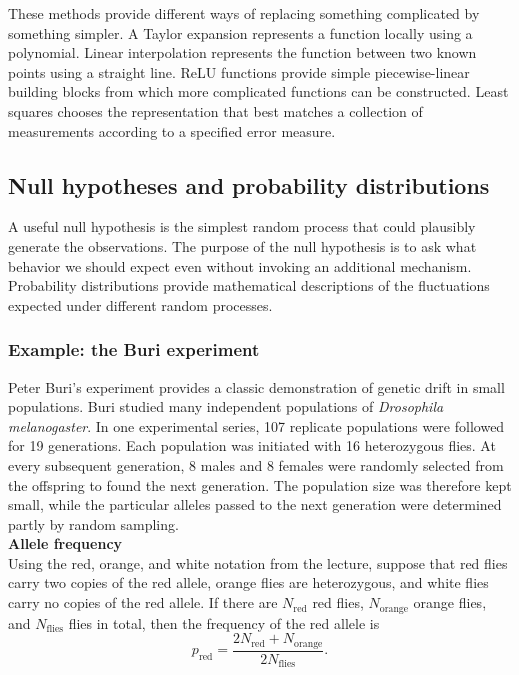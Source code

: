 \bigskip

These methods provide different ways of replacing something complicated by something simpler.
A Taylor expansion represents a function locally using a polynomial.
Linear interpolation represents the function between two known points using a straight line.
ReLU functions provide simple piecewise-linear building blocks from which more complicated functions can be constructed.
Least squares chooses the representation that best matches a collection of measurements according to a specified error measure.


\subsection{Null hypotheses and probability distributions}

A useful null hypothesis is the simplest random process that could plausibly generate the observations.
The purpose of the null hypothesis is to ask what behavior we should expect even without invoking an additional mechanism.
Probability distributions provide mathematical descriptions of the fluctuations expected under different random processes.

\subsubsection{Example: the Buri experiment}

Peter Buri's experiment provides a classic demonstration of genetic drift in small populations.
Buri studied many independent populations of \textit{Drosophila melanogaster}.
In one experimental series, 107 replicate populations were followed for 19 generations.
Each population was initiated with 16 heterozygous flies.
At every subsequent generation, 8 males and 8 females were randomly selected from the offspring to found the next generation.
The population size was therefore kept small, while the particular alleles passed to the next generation were determined partly by random sampling.
% 
\medskip
\\
\textbf{Allele frequency}
\\
Using the red, orange, and white notation from the lecture, suppose that red flies carry two copies of the red allele, orange flies are heterozygous, and white flies carry no copies of the red allele.
If there are $N_{\mathrm{red}}$ red flies, $N_{\mathrm{orange}}$ orange flies, and $N_{\mathrm{flies}}$ flies in total, then the frequency of the red allele is
\[
    p_{\mathrm{red}} = \frac{2N_{\mathrm{red}}+N_{\mathrm{orange}}}{2N_{\mathrm{flies}}}.
\]

